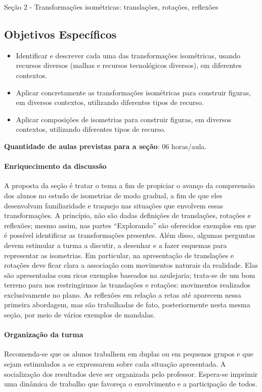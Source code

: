 \begin{paginatexto}{Seção 2 - Transformações isométricas: translações, rotações, reflexões}
\subsection{Objetivos Específicos}
\begin{itemize}
\item Identificar e descrever cada uma das transformações isométricas, usando recursos diversos (malhas e recursos tecnológicos diversos), em diferentes contextos.
\item Aplicar concretamente as transformações isométricas para construir figuras, em diversos contextos, utilizando diferentes tipos de recurso. 
\item Aplicar composições de isometrias para construir figuras, em diversos contextos, utilizando diferentes tipos de recurso. 
\end{itemize}

\textbf{Quantidade de aulas previstas para a seção}: 06 horas/aula.

\paragraph{Enriquecimento da discussão}
A proposta da seção é tratar o tema a fim de propiciar o avanço da compreensão dos alunos no estudo de isometrias de modo gradual, a fim de que eles desenvolvam familiaridade e traquejo nas situações que envolvem essas transformações.  A princípio, não são dadas definições de translações, rotações e reflexões; mesmo assim, nas partes “Explorando” são oferecidos exemplos em que é possível identificar as transformações presentes. Além disso, algumas perguntas devem estimular a turma a discutir, a desenhar e a fazer esquemas para representar as isometrias. Em particular, na apresentação de translações e rotações deve ficar clara a associação com movimentos naturais da realidade. Elas são apresentadas com ricos exemplos baseados na azulejaria; trata-se de um bom terreno para nos restringirmos às translações e rotações: movimentos realizados exclusivamente no plano. As reflexões em relação a retas até aparecem nessa primeira abordagem, mas são trabalhadas de fato, posteriormente nesta mesma seção, por meio de vários exemplos de mandalas.

\paragraph{Organização da turma}
Recomenda-se que os alunos trabalhem em duplas ou em pequenos grupos e que sejam estimulados a se expressarem sobre cada situação apresentada. A socialização dos resultados deve ser organizada pelo professor. Espera-se imprimir uma dinâmica de trabalho que favoreça o envolvimento e a participação de todos. 


\end{paginatexto}
